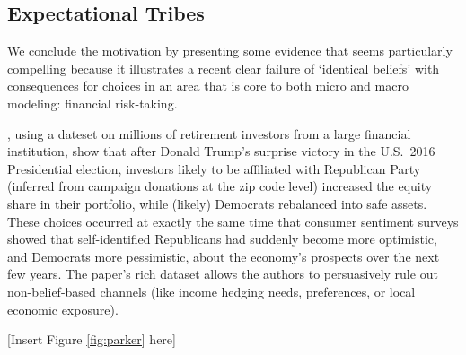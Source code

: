 \subsection{Expectational Tribes}\label{subsec:ExpTribes}

    We conclude the motivation by presenting some evidence that seems particularly compelling because it illustrates a recent clear failure of `identical beliefs' with consequences for choices in an area that is core to both micro and macro modeling: financial risk-taking.

    \href{https://github.com/iworld1991/EpiExp/blob/master/Literature/meeuwis2018belief.pdf}{\cite{meeuwis2018belief}}, using a dateset on millions of retirement investors from a large financial institution, show that after Donald Trump's surprise victory in the U.S.\ 2016 Presidential election, investors likely to be affiliated with Republican Party (inferred from  campaign donations at the zip code level) increased the equity share in their portfolio, while (likely) Democrats rebalanced into safe assets. These choices occurred at exactly the same time that consumer sentiment surveys showed that self-identified Republicans had suddenly become more optimistic, and Democrats more pessimistic, about the economy's prospects over the next few years.  The paper's rich dataset allows the authors to persuasively rule out non-belief-based channels (like income hedging needs, preferences, or local economic exposure). %


\centerline{    [Insert Figure \ref{fig:parker} here]}





